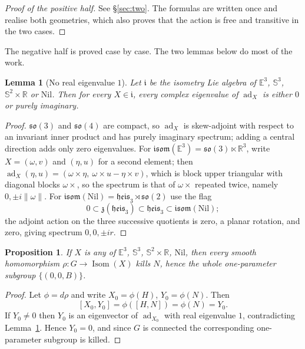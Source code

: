 \documentclass[11pt]{article}
\newtheorem{lemma}[theorem]{Lemma}
\newtheorem{proposition}[theorem]{Proposition}
\begin{document}
\begin{proof}[Proof of the positive half]
See \S\ref{sec:two}. The formulas are written once and realise both geometries,
which also proves that the action is free and transitive in the two cases.
\end{proof}

The negative half is proved case by case. The two lemmas below do most of the
work.

\begin{lemma}[No real eigenvalue $1$]
\label{lem:no-eigenvalue-one}
Let $\mathfrak i$ be the isometry Lie algebra of $\mathbb E^3$, $\mathbb S^3$,
$\mathbb S^2\times\mathbb R$ or $\mathrm{Nil}$. Then for every $X\in\mathfrak i$,
every complex eigenvalue of $\operatorname{ad}_X$ is either $0$ or purely
imaginary.
\end{lemma}

\begin{proof}
$\mathfrak{so}(3)$ and $\mathfrak{so}(4)$ are compact, so $\operatorname{ad}_X$
is skew-adjoint with respect to an invariant inner product and has purely
imaginary spectrum; adding a central direction adds only zero eigenvalues. For
$\mathfrak{isom}(\mathbb E^3)=\mathfrak{so}(3)\ltimes\mathbb R^3$, write
$X=(\omega,v)$ and $(\eta,u)$ for a second element; then
$\operatorname{ad}_X(\eta,u)=(\omega\times\eta,\ \omega\times u-\eta\times v)$,
which is block upper triangular with diagonal blocks $\omega\times$, so the
spectrum is that of $\omega\times$ repeated twice, namely $0,\pm i\|\omega\|$.
For $\mathfrak{isom}(\mathrm{Nil})=\mathfrak{heis}_3\rtimes\mathfrak{so}(2)$ use
the flag
\[
0\subset\mathfrak z(\mathfrak{heis}_3)\subset\mathfrak{heis}_3
\subset\mathfrak{isom}(\mathrm{Nil});
\]
the adjoint action on the three successive quotients is zero, a planar rotation,
and zero, giving spectrum $0,0,\pm ir$.
\end{proof}

\begin{proposition}
\label{prop:four-killed}
If $X$ is any of $\mathbb E^3$, $\mathbb S^3$, $\mathbb S^2\times\mathbb R$,
$\mathrm{Nil}$, then every smooth homomorphism $\rho:G\to\operatorname{Isom}(X)$
kills $N$, hence the whole one-parameter subgroup $\{(0,0,B)\}$.
\end{proposition}

\begin{proof}
Let $\phi=d\rho$ and write $X_0=\phi(H)$, $Y_0=\phi(N)$. Then
\[
[X_0,Y_0]=\phi([H,N])=\phi(N)=Y_0 .
\]
If $Y_0\ne0$ then $Y_0$ is an eigenvector of $\operatorname{ad}_{X_0}$ with real
eigenvalue $1$, contradicting Lemma~\ref{lem:no-eigenvalue-one}. Hence
$Y_0=0$, and since $G$ is connected the corresponding one-parameter subgroup is
killed.
\end{proof}
\end{document}
